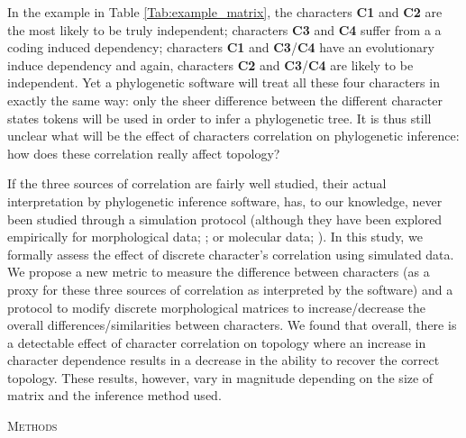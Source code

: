 \documentclass[12pt,letterpaper]{article}
\renewcommand{\section}[1]{%
\bigskip
\begin{center}
\begin{Large}
\normalfont\scshape #1
\medskip
\end{Large}
\end{center}}
\begin{document}
In the example in Table \ref{Tab:example_matrix}, the characters \textbf{C1} and \textbf{C2} are the most likely to be truly independent; characters \textbf{C3} and \textbf{C4} suffer from a a coding induced dependency; characters \textbf{C1} and \textbf{C3}/\textbf{C4} have an evolutionary induce dependency and again, characters \textbf{C2} and \textbf{C3}/\textbf{C4} are likely to be independent.
Yet a phylogenetic software will treat all these four characters in exactly the same way: only the sheer difference between the different character states tokens will be used in order to infer a phylogenetic tree.
It is thus still unclear what will be the effect of characters correlation on phylogenetic inference: how does these correlation really affect topology?

If the three sources of correlation are fairly well studied, their actual interpretation by phylogenetic inference software, has, to our knowledge, never been studied through a simulation protocol (although they have been explored empirically for morphological data; \citealt{Davalos01072014}; or molecular data; \citealt{ZouConvergence}).
In this study, we formally assess the effect of discrete character's correlation using simulated data.
We propose a new metric to measure the difference between characters (as a proxy for these three sources of correlation as interpreted by the software) and a protocol to modify discrete morphological matrices to increase/decrease the overall differences/similarities between characters.
We found that overall, there is a detectable effect of character correlation on topology where an increase in character dependence results in a decrease in the ability to recover the correct topology.
These results, however, vary in magnitude depending on the size of matrix and the inference method used.

\section{Methods}
\end{document}
